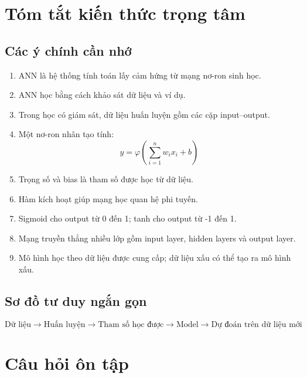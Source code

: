 \documentclass[12pt,a4paper]{report}
\begin{document}
\chapter{Tóm tắt kiến thức trọng tâm}

\section{Các ý chính cần nhớ}

\begin{enumerate}
    \item ANN là hệ thống tính toán lấy cảm hứng từ mạng nơ-ron sinh học.
    \item ANN học bằng cách khảo sát dữ liệu và ví dụ.
    \item Trong học có giám sát, dữ liệu huấn luyện gồm các cặp input--output.
    \item Một nơ-ron nhân tạo tính:
    \[
        y = \varphi\left(\sum_{i=1}^{n}w_ix_i+b\right)
    \]
    \item Trọng số và bias là tham số được học từ dữ liệu.
    \item Hàm kích hoạt giúp mạng học quan hệ phi tuyến.
    \item Sigmoid cho output từ 0 đến 1; tanh cho output từ -1 đến 1.
    \item Mạng truyền thẳng nhiều lớp gồm input layer, hidden layers và output layer.
    \item Mô hình học theo dữ liệu được cung cấp; dữ liệu xấu có thể tạo ra mô hình xấu.
\end{enumerate}

\section{Sơ đồ tư duy ngắn gọn}

\[
\boxed{
\text{Dữ liệu}
\rightarrow
\text{Huấn luyện}
\rightarrow
\text{Tham số học được}
\rightarrow
\text{Model}
\rightarrow
\text{Dự đoán trên dữ liệu mới}
}
\]

\chapter{Câu hỏi ôn tập}
\end{document}
